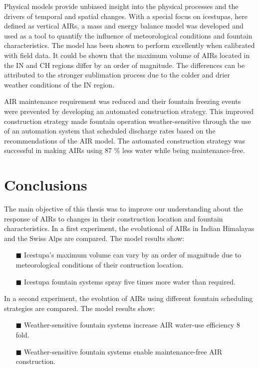 Physical models provide unbiased insight into the physical processes and the drivers of temporal and spatial
changes. With a special focus on icestupas, here defined as vertical AIRs, a mass and energy balance model was
developed and used as a tool to quantify the influence of meteorological conditions and fountain
characteristics.  The model has been shown to perform excellently when calibrated with field data.  It could be
shown that the maximum volume of AIRs located in the IN and CH regions differ by an order of magnitude. The
differences can be attributed to the stronger sublimation process due to the colder and drier weather conditions
of the IN region. 

AIR maintenance requirement was reduced and their fountain freezing events were prevented by developing an
automated construction strategy. This improved construction strategy made fountain operation weather-sensitive
through the use of an automation system that scheduled discharge rates based on the recommendations of the AIR
model. The automated construction strategy was successful in making AIRs using 87 \% less water while being
maintenance-free.

\section{Conclusions}

The main objective of this thesis was to improve our understanding about the response of AIRs to changes in
their construction location and fountain characteristics. In a first experiment, the evolutional of AIRs in
Indian Himalayas and the Swiss Alps are compared. The model results show: 

\begin{itemize} 

\item[\tiny{$\blacksquare$}] Icestupa's maximum volume can vary by an order of magnitude due to meteorological
  conditions of their contruction location. 

\item[\tiny{$\blacksquare$}] Icestupa fountain systems spray five times more water than required.

\end{itemize}

In a second experiment, the evolution of AIRs using different fountain scheduling strategies are compared. The
model results show: 

\begin{itemize} 

\item[\tiny{$\blacksquare$}] Weather-sensitive fountain systems increase AIR water-use efficiency 8 fold.

\item[\tiny{$\blacksquare$}] Weather-sensitive fountain systems enable maintenance-free AIR construction.


\end{itemize}

